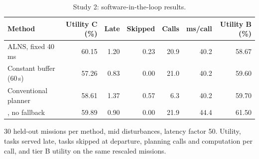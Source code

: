\begin{table}[t]
\caption{Study 2: software-in-the-loop results.}\label{tab:s2tierc}
\centering\small
\begin{threeparttable}
\begin{tabular}{lrrrrrr}
\toprule
Method & Utility C (\%) & Late & Skipped & Calls & ms/call & Utility B (\%) \\
\midrule
ALNS, fixed 40 ms & 60.15 & 1.20 & 0.23 & 20.9 & 40.2 & 58.67 \\
Constant buffer (60\,s) & 57.26 & 0.83 & 0.00 & 21.0 & 40.2 & 59.60 \\
Conventional planner & 58.61 & 1.37 & 0.57 & 6.3 & 40.2 & 59.70 \\
\mname{}, no fallback & 59.89 & 0.90 & 0.00 & 21.9 & 44.4 & 61.50 \\
\bottomrule
\end{tabular}
\begin{tablenotes}[flushleft]\scriptsize
\item[] 30 held-out missions per method, mid disturbances, latency factor 50. Utility, tasks served late, tasks skipped at departure, planning calls and computation per call, and tier B utility on the same rescaled missions.
\end{tablenotes}
\end{threeparttable}
\end{table}
